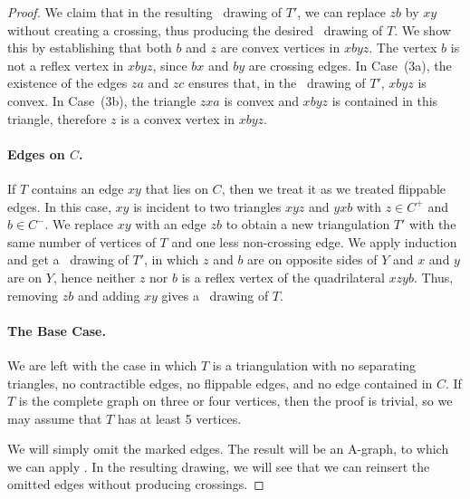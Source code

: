\begin{proof}
We claim that in the resulting \Fary\ drawing of $T'$,
we can replace $zb$ by $xy$ without creating a crossing, thus producing
 the desired \Fary\ drawing of $T$.
%
We show this by establishing that both $b$ and $z$ are convex vertices in $xbyz$.
The vertex $b$ is not a reflex vertex in $xbyz$, since $bx$ and $by$ are crossing
edges.
                In Case~(3a), the existence of the
	edges $za$ and $zc$ ensures that, in the \Fary\ drawing of $T'$,
	$xbyz$ is convex. In Case~(3b), the triangle $zxa$ is convex
        and $xbyz$ is contained in this triangle, therefore $z$ is
        a convex  vertex in $xbyz$.
	
	\paragraph{Edges on $C$.}
	
	If $T$ contains an edge $xy$ that lies on $C$, then we treat it as we treated flippable edges. In this case, $xy$ is incident to two triangles $xyz$ and $yxb$ with $z\in C^+$ and $b\in C^-$. We replace $xy$ with an edge $zb$ to obtain a new triangulation $T'$ with the same number of vertices of $T$ and one less non-crossing edge. We apply induction and get a \Fary\ drawing of $T'$, in which $z$ and $b$ are
	on opposite sides of $Y$ and $x$ and $y$ are on $Y$, hence 	neither $z$ nor $b$ is a reflex vertex of the quadrilateral $xzyb$.
	Thus, removing $zb$ and adding $xy$ gives a \Fary\ drawing of $T$.
	
	\paragraph{The Base Case.}
	
	We are left with the case in which $T$ is a triangulation
	with no separating triangles, no contractible edges, no flippable
	edges, and no edge contained in $C$.  If $T$ is the complete graph
	on three or four vertices, then the proof is trivial,
	so we may assume that $T$ has at least 5 vertices.

        We will simply omit the marked edges. The result will be an
        A-graph, to which we can apply . In the
        resulting drawing, we will see that we can reinsert the
        omitted edges without producing crossings.


\end{proof}
